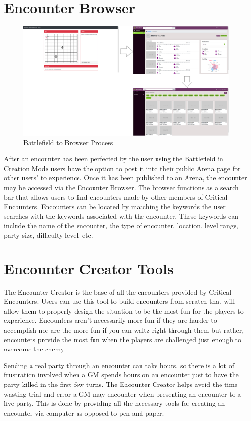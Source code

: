 \documentclass[12pt,a4paper]{report}
\begin{document}
	\section{Encounter Browser}
	\begin{figure}[H]
		\centering
		\centerline{\includegraphics[scale=.15]{battlefieldArenaBrowserNav}}
		\caption{Battlefield to Browser Process}
		\label{fig: battlefield to Browser}
	\end{figure}
	After an encounter has been perfected by the user using the Battlefield in Creation Mode users have the option to post it into their public Arena page for other users' to experience. Once it has been published to an Arena, the encounter may be accessed via the Encounter Browser. The browser functions as a search bar that allows users to find encounters made by other members of Critical Encounters. Encounters can be located by matching the keywords the user searches with the keywords associated with the encounter. These keywords can include the name of the encounter, the type of encounter, location, level range, party size, difficulty level, etc.
	
	\newpage
	\section{Encounter Creator Tools}
	The Encounter Creator is the base of all the encounters provided by Critical Encounters. Users can use this tool to build encounters from scratch that will allow them to properly design the situation to be the most fun for the players to experience. Encounters aren't necessarily more fun if they are harder to accomplish nor are the more fun if you can waltz right through them but rather, encounters provide the most fun when the players are challenged just enough to overcome the enemy. 
	
	Sending a real party through an encounter can take hours, so there is a lot of frustration involved when a GM spends hours on an encounter just to have the party killed in the first few turns. The Encounter Creator helps avoid the time wasting trial and error a GM may encounter when presenting an encounter to a live party. This is done by providing all the necessary tools for creating an encounter via computer as opposed to pen and paper.
\end{document}

